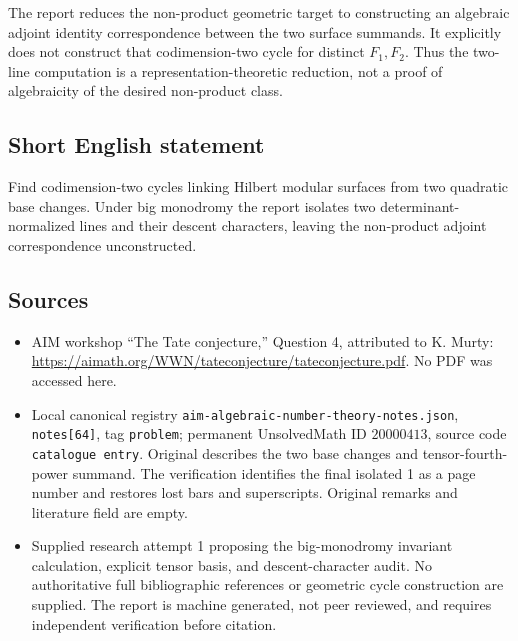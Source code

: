\documentclass[11pt]{article}
\begin{document}
The report reduces the non-product geometric target to constructing an algebraic adjoint identity correspondence between the two surface summands. It explicitly does not construct that codimension-two cycle for distinct \(F_1,F_2\). Thus the two-line computation is a representation-theoretic reduction, not a proof of algebraicity of the desired non-product class.
\subsection{Short English statement}
Find codimension-two cycles linking Hilbert modular surfaces from two quadratic base changes. Under big monodromy the report isolates two determinant-normalized lines and their descent characters, leaving the non-product adjoint correspondence unconstructed.
\subsection{Sources}
\begin{itemize}
\item AIM workshop ``The Tate conjecture,'' Question 4, attributed to K. Murty: \url{https://aimath.org/WWN/tateconjecture/tateconjecture.pdf}. No PDF was accessed here.
\item Local canonical registry \texttt{aim-algebraic-number-theory-notes.json}, \texttt{notes[64]}, tag \texttt{problem}; permanent UnsolvedMath ID \(20000413\), source code \texttt{catalogue entry}. Original describes the two base changes and tensor-fourth-power summand. The verification identifies the final isolated 1 as a page number and restores lost bars and superscripts. Original remarks and literature field are empty.
\item Supplied research attempt 1 proposing the big-monodromy invariant calculation, explicit tensor basis, and descent-character audit. No authoritative full bibliographic references or geometric cycle construction are supplied. The report is machine generated, not peer reviewed, and requires independent verification before citation.
\end{itemize}
\end{document}
